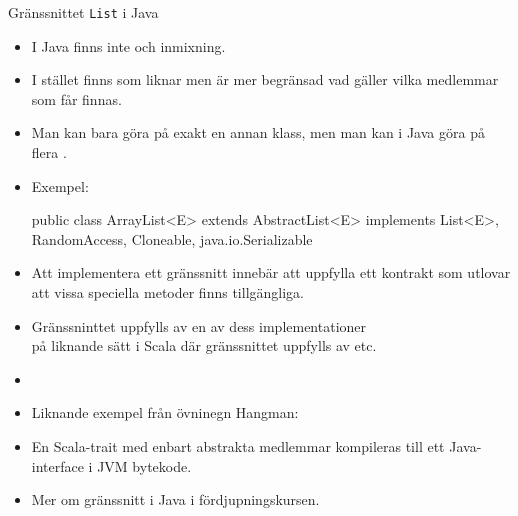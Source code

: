 \begin{Slide}{Gränssnittet \texttt{List} i Java}\SlideFontSmall
\begin{itemize}
\item I Java finns inte  och inmixning.

\item I stället finns  som liknar  men är mer begränsad vad gäller vilka medlemmar som får finnas.

\item Man kan bara göra  på exakt en annan klass, men man kan i Java göra  på flera .%

\item Exempel:
\begin{Code}[language=Java,backgroundcolor=\color{white},
  frame=none]
public class ArrayList<E> extends AbstractList<E>
    implements List<E>, RandomAccess, Cloneable, java.io.Serializable
\end{Code}

\item Att implementera ett gränssnitt innebär att uppfylla ett kontrakt som utlovar att vissa speciella metoder finns tillgängliga.

\item Gränssninttet  uppfylls av en av dess implementationer  \\

på liknande sätt i Scala där gränssnittet  uppfylls av  etc.

\item[] 

\item Liknande exempel från övninegn Hangman: 

\item En Scala-trait med enbart abstrakta medlemmar kompileras till ett Java-interface i JVM bytekode.

\item Mer om gränssnitt i Java i fördjupningskursen.

\end{itemize}
\end{Slide}


